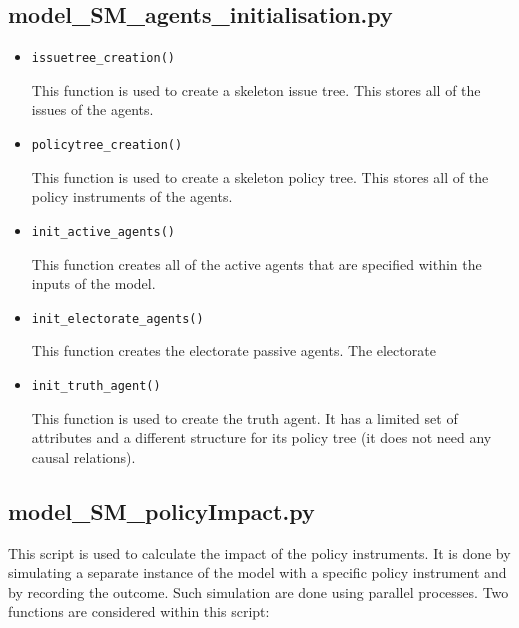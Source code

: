 \documentclass[11pt]{article}
\begin{document}


\subsection{model\_SM\_agents\_initialisation.py}

\begin{itemize}
\item \texttt{issuetree\_creation()}

This function is used to create a skeleton issue tree. This stores all of the issues of the agents.

\item \texttt{policytree\_creation()}

This function is used to create a skeleton policy tree. This stores all of the policy instruments of the agents.

\item \texttt{init\_active\_agents()}

This function creates all of the active agents that are specified within the inputs of the model.

\item \texttt{init\_electorate\_agents()}

This function creates the electorate passive agents. The electorate 

\item \texttt{init\_truth\_agent()}

This function is used to create the truth agent. It has a limited set of attributes and a different structure for its policy tree (it does not need any causal relations).

\end{itemize}



\subsection{model\_SM\_policyImpact.py}

This script is used to calculate the impact of the policy instruments. It is done by simulating a separate instance of the model with a specific policy instrument and by recording the outcome. Such simulation are done using parallel processes. Two functions are considered within this script:
\end{document}
